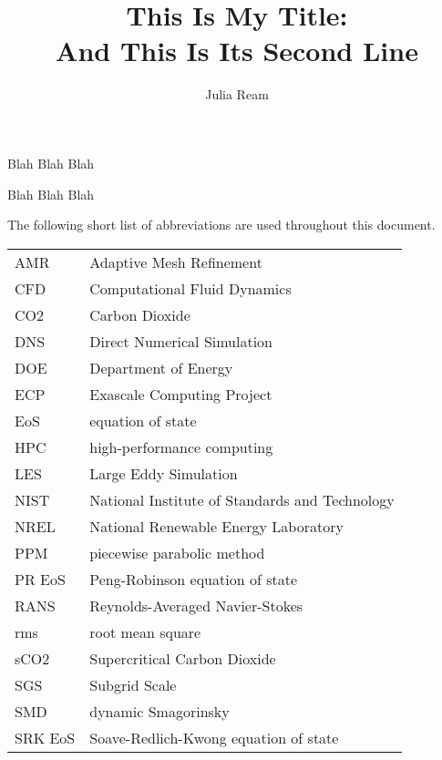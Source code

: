\documentclass[11pt,expanded,copyright]{fsuthesis}
\title{This Is My Title:\protect\\And This Is Its Second Line}
\author{Julia Ream}
\begin{document}
\frontmatter
\maketitle
\makecommitteepage

\begin{dedication}
Blah Blah Blah
\end{dedication}

\begin{acknowledgments}
Blah Blah Blah
\end{acknowledgments}

\tableofcontents
\listoftables
\listoffigures



\begin{listofabbrevs}
The following short list of abbreviations are used throughout this document. 
\begin{center}
\begin{tabular}{ll}
AMR& Adaptive Mesh Refinement \\
CFD& Computational Fluid Dynamics \\
CO2& Carbon Dioxide \\
DNS& Direct Numerical Simulation \\
DOE& Department of Energy \\
ECP& Exascale Computing Project \\
EoS& equation of state \\
HPC& high-performance computing \\
LES& Large Eddy Simulation \\
NIST& National Institute of Standards and Technology \\
NREL& National Renewable Energy Laboratory \\
PPM& piecewise parabolic method \\
PR EoS& Peng-Robinson equation of state \\
RANS& Reynolds-Averaged Navier-Stokes \\
rms& root mean square \\
sCO2& Supercritical Carbon Dioxide \\
SGS& Subgrid Scale \\
SMD& dynamic Smagorinsky \\
SRK EoS&Soave-Redlich-Kwong equation of state \\





\end{tabular}
\end{center}
\end{listofabbrevs}
\end{document}
